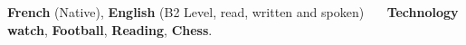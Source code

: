 

\begin{cventries}

\renewcommand{\labelitemi}{}
\begin{cvitems2} %
    \small
    \renewcommand{\labelitemi}{}
    \item {\textbf{French} (Native), \textbf{English} (B2 Level, read, written and spoken) \textbf{~\vert~}  \textbf{Technology watch}, \textbf{Football}, \textbf{Reading}, \textbf{Chess}.}
\end{cvitems2}
\end{cventries}

\vspace{3mm} %




